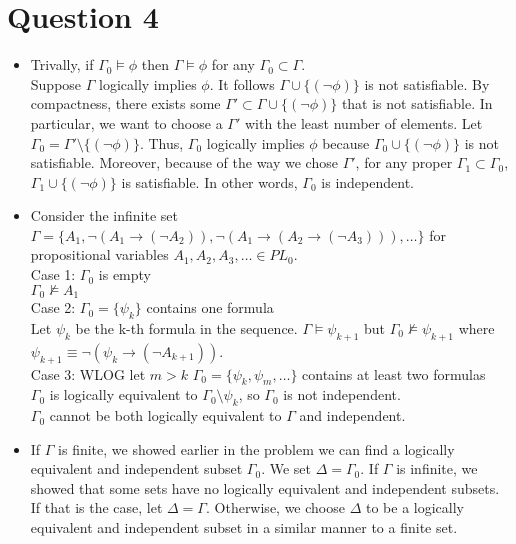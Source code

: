 \documentclass[10pt]{article}
\begin{document}
\section*{Question 4}
\begin{itemize}
    \item Trivally, if $\Gamma_0\models\phi$ then $\Gamma\models\phi$ for any $\Gamma_0\subset\Gamma$.\\
    Suppose $\Gamma$ logically implies $\phi$. 
    It follows $\Gamma\cup\{(\lnot\phi)\}$ is not satisfiable.
    By compactness, there exists some $\Gamma'\subset\Gamma\cup\{(\lnot\phi)\}$ that is not satisfiable.
    In particular, we want to choose a $\Gamma'$ with the least number of elements. 
    Let $\Gamma_0=\Gamma'\setminus\{(\lnot\phi)\}$. 
    Thus, $\Gamma_0$ logically implies $\phi$ because $\Gamma_0\cup\{(\lnot\phi)\}$ is not satisfiable. 
    Moreover, because of the way we chose $\Gamma'$, for any proper $\Gamma_1\subset\Gamma_0$, $\Gamma_1\cup\{(\lnot\phi)\}$ is satisfiable.
    In other words, $\Gamma_0$ is independent.
    \item Consider the infinite set $\Gamma=\{A_1,\lnot(A_1\rightarrow(\lnot A_2)),\lnot(A_1\rightarrow(A_2\rightarrow(\lnot A_3))),\ldots\}$ for propositional variables $A_1,A_2,A_3,\ldots\in PL_0$.\\
    Case 1: $\Gamma_0$ is empty\\
    $\Gamma_0\not\models A_1$\\
    Case 2: $\Gamma_0=\{\psi_k\}$ contains one formula\\
    Let $\psi_k$ be the k-th formula in the sequence.
    $\Gamma\models\psi_{k+1}$ but $\Gamma_0\not\models \psi_{k+1}$ where $\psi_{k+1}\equiv\lnot(\psi_k\rightarrow(\lnot A_{k+1}))$.\\
    Case 3: WLOG let $m>k$ $\Gamma_0=\{\psi_k,\psi_m,\ldots\}$ contains at least two formulas\\
    $\Gamma_0$ is logically equivalent to $\Gamma_0\setminus{\psi_k}$, so $\Gamma_0$ is not independent.\\
    $\Gamma_0$ cannot be both logically equivalent to $\Gamma$ and independent.
    \item If $\Gamma$ is finite, we showed earlier in the problem we can find a logically equivalent and independent subset $\Gamma_0$. 
    We set $\Delta=\Gamma_0$. 
    If $\Gamma$ is infinite, we showed that some sets have no logically equivalent and independent subsets. 
    If that is the case, let $\Delta=\Gamma$. Otherwise, we choose $\Delta$ to be a logically equivalent and independent subset in a similar manner to a finite set.
\end{itemize}
\end{document}
